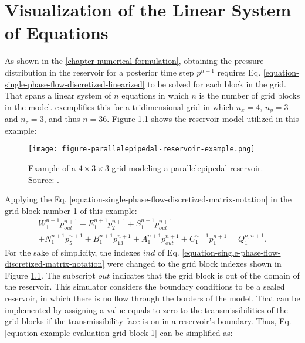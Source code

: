 \chapter{Visualization of the Linear System of Equations}
\label{appendix-visualization-of-the-linear-system-of-equations}

As shown in the \autoref{chapter-numerical-formulation}, obtaining the pressure distribution in the reservoir for a posterior time step $p^{n+1}$ requires Eq. \ref{equation-single-phase-flow-discretized-linearized} to be solved for each block in the grid.
%
That spans a linear system of $n$ equations in which $n$ is the number of grid blocks in the model.
%
\cite{Ertekin2001} exemplifies this for a tridimensional grid in which $n_x = 4$, $n_y = 3$ and $n_z = 3$, and thus $n = 36$.
%
Figure \ref{figure-parallelepipedal-reservoir-example} shows the reservoir model utilized in this example:
%
\begin{figure}[H]
	\centering
	\texttt{[image: figure-parallelepipedal-reservoir-example.png]}\\
	\caption{Example of a $4 \times 3 \times 3$ grid modeling a parallelepipedal reservoir. Source: \cite{Ertekin2001}.}
	\label{figure-parallelepipedal-reservoir-example}
\end{figure}
\noindent
%
Applying the Eq. \ref{equation-single-phase-flow-discretized-matrix-notation} in the grid block number 1 of this example:
%
%
\begin{multline}
	\label{equation-example-evaluation-grid-block-1}
	W^{n+1}_{1}p^{n+1}_{out}+E^{n+1}_{1}p^{n+1}_{2}+S^{n+1}_{1}p^{n+1}_{out}\\+N^{n+1}_{1}p^{n+1}_{5}+B^{n+1}_{1}p^{n+1}_{13}+A^{n+1}_{1}p^{n+1}_{out}+C^{n+1}_{1}p^{n+1}_{1}=Q^{n, n+1}_{1}.
\end{multline}
%
For the sake of simplicity, the indexes $ind$ of Eq. \ref{equation-single-phase-flow-discretized-matrix-notation} were changed to the grid block indexes shown in Figure \ref{figure-parallelepipedal-reservoir-example}.
%
The subscript $out$ indicates that the grid block is out of the domain of the reservoir. 
%
This simulator considers the boundary conditions to be a sealed reservoir, in which there is no flow through the borders of the model. 
%
That can be implemented by assigning a value equals to zero to the transmissibilities of the grid blocks if the transmissibility face is on in a reservoir's boundary. 
%
Thus, Eq. \ref{equation-example-evaluation-grid-block-1} can be simplified as:
